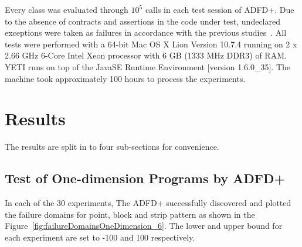 Every class was evaluated through $10^5$ calls in each test session of ADFD+.
Due to the absence of contracts and assertions in the code under test, undeclared exceptions were taken as failures in accordance with the previous studies~\cite{ahmad2013adfd, Oriol2011yeti}. All tests were performed with a 64-bit Mac OS X Lion Version 10.7.4 running on 2 x 2.66 GHz 6-Core Intel Xeon processor with 6 GB (1333 MHz DDR3) of RAM. YETI runs on top of the Java\texttrademark  SE Runtime Environment [version 1.6.0\_35]. The machine took approximately 100 hours to process the experiments.

\section{Results}

The results are split in to four sub-sections for convenience. 






\subsection{Test of One-dimension Programs by ADFD+}\label{sec:intro6_10}
In each of the 30 experiments, The ADFD+ successfully discovered and plotted the failure domains for point, block and strip pattern as shown in the Figure~\ref{fig:failureDomainsOneDimension_6}. The lower and upper bound for each experiment are set to -100 and 100 respectively.

